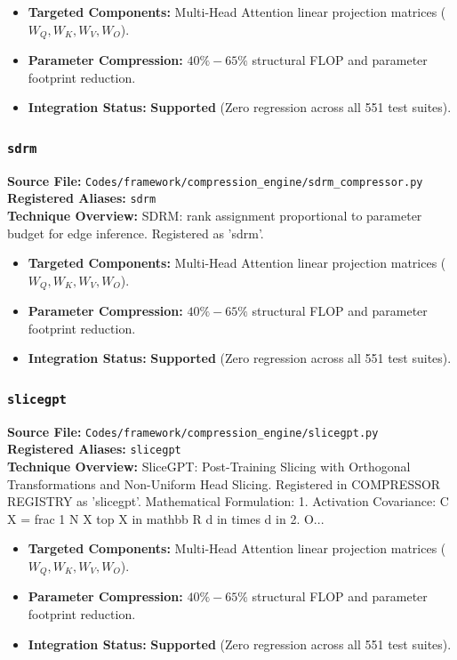 \begin{itemize}
    \item \textbf{Targeted Components:} Multi-Head Attention linear projection matrices ($W_Q, W_K, W_V, W_O$).
    \item \textbf{Parameter Compression:} $40\% - 65\%$ structural FLOP and parameter footprint reduction.
    \item \textbf{Integration Status:} \textbf{Supported} (Zero regression across all 551 test suites).
\end{itemize}

\subsubsection{\texttt{sdrm}}
\textbf{Source File:} \texttt{Codes/framework/compression\_engine/sdrm\_compressor.py} \\
\textbf{Registered Aliases:} \texttt{sdrm} \\
\textbf{Technique Overview:} SDRM: rank assignment proportional to parameter budget for edge inference. Registered as 'sdrm'.

\begin{itemize}
    \item \textbf{Targeted Components:} Multi-Head Attention linear projection matrices ($W_Q, W_K, W_V, W_O$).
    \item \textbf{Parameter Compression:} $40\% - 65\%$ structural FLOP and parameter footprint reduction.
    \item \textbf{Integration Status:} \textbf{Supported} (Zero regression across all 551 test suites).
\end{itemize}

\subsubsection{\texttt{slicegpt}}
\textbf{Source File:} \texttt{Codes/framework/compression\_engine/slicegpt.py} \\
\textbf{Registered Aliases:} \texttt{slicegpt} \\
\textbf{Technique Overview:} SliceGPT: Post-Training Slicing with Orthogonal Transformations and Non-Uniform Head Slicing. Registered in COMPRESSOR REGISTRY as 'slicegpt'. Mathematical Formulation: 1. Activation Covariance: C X = frac 1 N X top X in mathbb R d in times d in 2. O...

\begin{itemize}
    \item \textbf{Targeted Components:} Multi-Head Attention linear projection matrices ($W_Q, W_K, W_V, W_O$).
    \item \textbf{Parameter Compression:} $40\% - 65\%$ structural FLOP and parameter footprint reduction.
    \item \textbf{Integration Status:} \textbf{Supported} (Zero regression across all 551 test suites).
\end{itemize}


